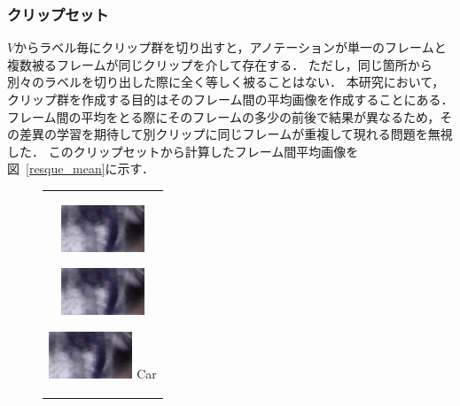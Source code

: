 \subsubsection{クリップセット}
$V$からラベル毎にクリップ群を切り出すと，アノテーションが単一のフレームと複数被るフレームが同じクリップを介して存在する．
ただし，同じ箇所から別々のラベルを切り出した際に全く等しく被ることはない．
本研究において，クリップ群を作成する目的はそのフレーム間の平均画像を作成することにある．
フレーム間の平均をとる際にそのフレームの多少の前後で結果が異なるため，その差異の学習を期待して別クリップに同じフレームが重複して現れる問題を無視した．
このクリップセットから計算したフレーム間平均画像を図~\ref{resque_mean}に示す．


\begin{figure}[htbp]
    \begin{tabular}{c}
      \begin{minipage}{0.18\hsize}
        \begin{center}
          \includegraphics[clip, width=2.5cm]{./Figures/resque_mean1.eps}
          \hspace{0.3cm} { }
        \end{center}
      \end{minipage}
      \begin{minipage}{0.18\hsize}
        \begin{center}
          \includegraphics[clip, width=2.5cm]{./Figures/resque_mean1.eps}
          \hspace{0.3cm} { }
        \end{center}
      \end{minipage}
      \begin{minipage}{0.18\hsize}
        \begin{center}
          \includegraphics[clip, width=2.5cm]{./Figures/resque_mean1.eps}
          \hspace{2.0cm} {Car}

\end{center}
\end{minipage}
\end{tabular}
\end{figure}
